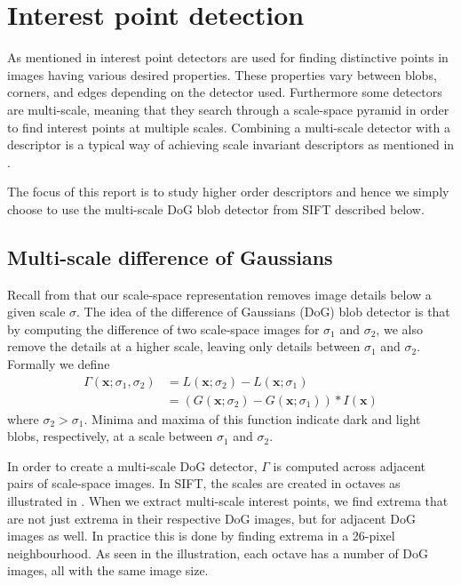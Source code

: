 \documentclass[thesis.tex]{subfiles}
\def\x{\mathbf{x}}
\begin{document}
\section{Interest point detection}
\label{sec:interestPointDetectors}
As mentioned in  interest point detectors are used for finding distinctive points in images having various desired properties. These properties vary between blobs, corners, and edges depending on the detector used. Furthermore some detectors are multi-scale, meaning that they search through a scale-space pyramid in order to find interest points at multiple scales. Combining a multi-scale detector with a descriptor is a typical way of achieving scale invariant descriptors as mentioned in .

The focus of this report is to study higher order descriptors and hence we simply choose to use the multi-scale DoG blob detector from SIFT \cite{lowe2004distinctive} described below.

\subsection{Multi-scale difference of Gaussians}
\label{sec:multiscaleDoG}

Recall from  that our scale-space representation removes image details below a given scale $\sigma$. The idea of the difference of Gaussians (DoG) blob detector is that by computing the difference of two scale-space images for $\sigma_1$ and $\sigma_2$, we also remove the details at a higher scale, leaving only details between $\sigma_1$ and $\sigma_2$. Formally we define
%
\begin{align*}
\Gamma(\x;\sigma_1,\sigma_2) &= L(\x;\sigma_2) - L(\x;\sigma_1) \\
&= \left( G(\x;\sigma_2) - G(\x;\sigma_1) \right) \ast I(\x)
\end{align*}
%
where $\sigma_2 > \sigma_1$. Minima and maxima of this function indicate dark and light blobs, respectively, at a scale between $\sigma_1$ and $\sigma_2$.

In order to create a multi-scale DoG detector, $\Gamma$ is computed across adjacent pairs of scale-space images. In SIFT, the scales are created in octaves as illustrated in . When we extract multi-scale interest points, we find extrema that are not just extrema in their respective DoG images, but for adjacent DoG images as well. In practice this is done by finding extrema in a 26-pixel neighbourhood. As seen in the illustration, each octave has a number of DoG images, all with the same image size.
\end{document}
